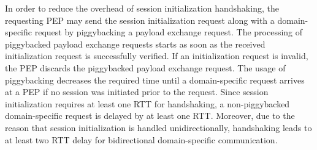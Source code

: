 \begin{description}
    In order to reduce the overhead of session initialization handshaking, the requesting PEP may send the session initialization request along with a domain-specific request by piggybacking a payload exchange request.
    The processing of piggybacked payload exchange requests starts as soon as the received initialization request is successfully verified.
    If an initialization request is invalid, the PEP discards the piggybacked payload exchange request.
    The usage of piggybacking decreases the required time until a domain-specific request arrives at a PEP if no session was initiated prior to the request.
    Since session initialization requires at least one RTT for handshaking, a non-piggybacked domain-specific request is delayed by at least one RTT.
    Moreover, due to the reason that session initialization is handled unidirectionally, handshaking leads to at least two RTT delay for bidirectional domain-specific communication.


\end{description}
